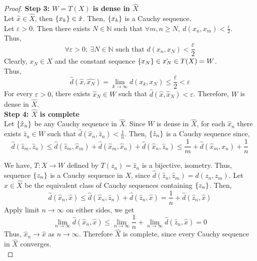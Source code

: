 \begin{proof}
	\textbf{Step 3: $W = T(X)$ is dense in $\hat{X}$}\\
	Let $\hat{x} \in \hat{X}$, then $\{x_k\} \in \hat{x}$.
	Then, $\{x_k\}$ is a Cauchy sequence.\\
	Let $\varepsilon > 0$.
	Then there exists $N \in \mathbb{N}$ such that $\forall m,n \ge N,\ d(x_n,x_m) < \frac{\varepsilon}{2}$.\\
	Thus,
	$$ \forall \varepsilon > 0,\ \exists N \in \mathbb{N} \text{ such that } d(x_n,x_N) < \frac{\varepsilon}{2} $$
	Clearly, $x_N \in X$ and the constant sequence $\{x_N\} \in \hat{x_N} \in T(X) = W$.\\
	Thus,
	$$\hat{d}(\hat{x},\hat{x_N}) = \lim_{k \to \infty} d(x_k,x_N) \le \frac{\varepsilon}{2} < \varepsilon $$
	For every $\varepsilon > 0$, there exists $\hat{x}_N \in W$ such that $\hat{d}(\hat{x},\hat{x}_N) < \varepsilon$.
	Therefore, $W$ is dense in $\hat{X}$.\\

	\textbf{Step 4: $\hat{X}$ is complete}\\
	Let $\{\hat{x}_n\}$ be any Cauchy sequence in $\hat{X}$.
	Since $W$ is dense in $\hat{X}$, for each $\hat{x}_n$ there exists $\hat{z}_n \in W$ such that $\hat{d}(\hat{x}_n,\hat{z}_n) < \frac{1}{n}$.
	Then, $\{\hat{z}_n\}$ is a Cauchy sequence since,
	$$ \hat{d}(\hat{z}_m,\hat{z}_n) \le \hat{d}(\hat{z}_m,\hat{x}_m) + \hat{d}(\hat{x}_m,\hat{x}_n)+\hat{d}(\hat{x}_n,\hat{z}_n) \le \frac{1}{m} + \hat{d}(\hat{x}_m,\hat{x}_n) + \frac{1}{n} $$

	We have, $T : X \to W$ defined by $T(z_n) = \hat{z}_n$ is a bijective, isometry.
	Thus, sequence $\{z_n\}$ is a Cauchy sequence in $X$, since $\hat{d}(\hat{z}_n,\hat{z}_m) = d(z_n,z_m)$.
	Let $\hat{x} \in \hat{X}$ be the equivalent class of Cauchy sequences containing $\{z_n\}$.
	Then,
	$$ \hat{d}(\hat{x}_n,\hat{x}) \le \hat{d}(\hat{x}_n,\hat{z}_n) + \hat{d}(\hat{z}_n,\hat{x}) = \frac{1}{n} + \hat{d}(\hat{z}_n,\hat{x}) $$
	Apply limit $n \to \infty$ on either sides, we get
	$$ \lim_{n \to \infty} \hat{d}(\hat{x}_n,\hat{x}) \le \lim_{n \to \infty} \frac{1}{n} + \lim_{n \to \infty} \hat{d}(\hat{z}_n,\hat{x}) = 0 $$
	Thus, $\hat{x}_n \to \hat{x}$ as $n \to \infty$.
	Therefore $\hat{X}$ is complete, since every Cauchy sequence in $\hat{X}$ converges.\\


\end{proof}
